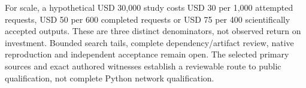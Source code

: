 For scale, a hypothetical USD 30,000 study costs USD 30 per 1,000 attempted requests, USD 50 per 600 completed requests or USD 75 per 400 scientifically accepted outputs. These are three distinct denominators, not observed return on investment. Bounded search tails, complete dependency/artifact review, native reproduction and independent acceptance remain open. The selected primary sources and exact authored witnesses establish a reviewable route to public qualification, not complete Python network qualification.~\citep{exec25_pnet_choice}

